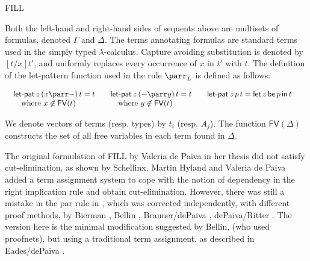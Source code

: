 \begin{entry}{FILL}
\begin{clarifications}
Both the left-hand and right-hand sides of sequents above are
multisets of formulas, denoted $\Gamma$ and $\Delta$.  The terms
annotating formulas are standard terms used in the simply typed
$\lambda$-calculus.  Capture avoiding substitution is denoted by
$[t/x]t'$, and uniformly replaces every occurrence of $x$ in $t'$ with
$t$.  The definition of the let-pattern function used in the rule
$\parr_L$ is defined as follows:
\begin{center}
    \begin{math}
      \begin{array}{lll}      
        \begin{array}{lll}
          \letpat{z}{(x \parr -)}{t} = t\\
          \,\,\,\,\,\,\mbox{where } x \not\in \mathsf{FV}(t)\\
        \end{array}
        & 
          \begin{array}{lll}
            \letpat{z}{(- \parr y)}{t} = t\\
        \,\,\,\,\,\,\mbox{where } y \not\in \mathsf{FV}(t)\\
          \end{array}
        & 
          \begin{array}{lll}
            \letpat{z}{p}{t} = \letbe{z}{p}{t}\\
            & \\
          \end{array}
      \end{array}
    \end{math}
\end{center}
We denote vectors of terms (resp. types) by $t_i$ (resp. $A_j$).  The
function $\mathsf{FV}(\Delta)$ constructs the set of all free
variables in each term found in $\Delta$.
\end{clarifications}

\begin{history}
The original formulation of FILL by Valeria de Paiva in her
thesis \cite{dePaiva:1990} did not satisfy cut-elimination, as shown
by Schellinx.  Martin Hyland and Valeria de Paiva \cite{Hyland:1993}
added a term assignment system to cope with the notion of dependency
in the right implication rule and obtain cut-elimination. However,
there was still a mistake in the par rule in \cite{Hyland:1993}, which
was corrected independently, with different proof methods, by Bierman
\cite{Bierman:1996}, Bellin \cite{Bellin:1997}, Brauner/dePaiva \cite{Brauner:1998}, 
dePaiva/Ritter \cite{dePaiva:2006}. The version here is the minimal
modification suggested by Bellin, (who used proofnets), but using a
traditional term assignment, as described in
Eades/dePaiva \cite{Eades:2015}.
\end{history}


\end{entry}
